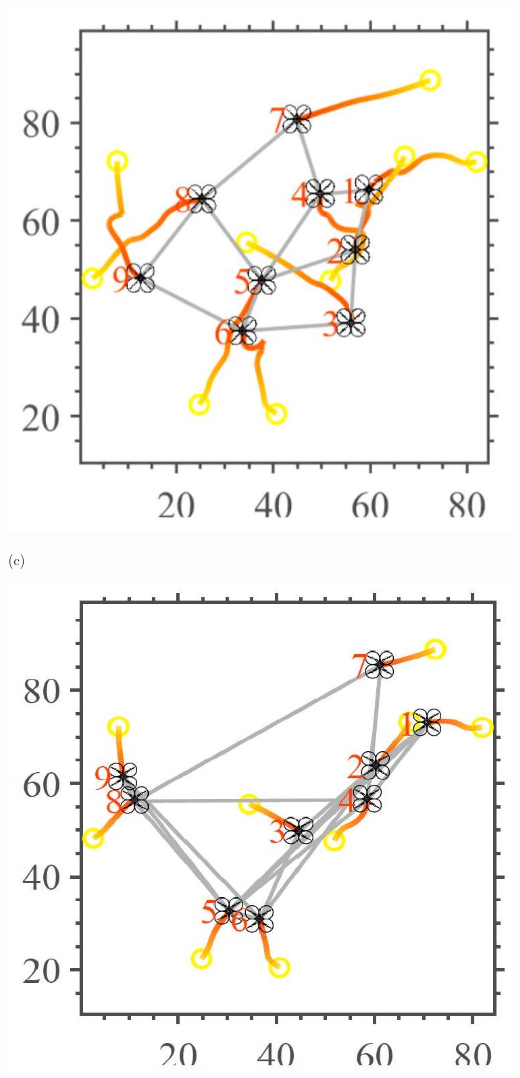 \documentclass[10pt]{article}
\begin{document}
\begin{center}
\includegraphics[max width=\textwidth]{2023_10_07_53b70c7408bc8e139415g-50}
\end{center}

(c)

\begin{center}
\includegraphics[max width=\textwidth]{2023_10_07_53b70c7408bc8e139415g-50(3)}
\end{center}
\end{document}
